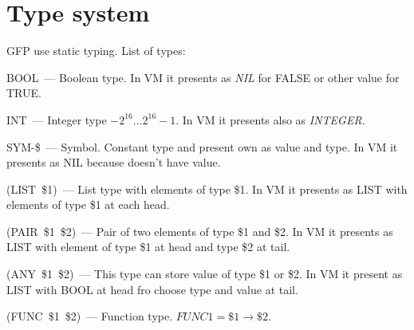 \documentclass[a4paper]{article}
\begin{document}
 {}
 \section{Type system}
  GFP use static typing. List of types:
  \begin{list}{-}{}
   \item BOOL~--- Boolean type. In VM it presents as \textit{NIL} for FALSE or other value for TRUE. 
   \item INT~--- Integer type $-2^{16} \ldots 2^{16}-1$. In VM it presents also as \textit{INTEGER}.
   \item SYM-\$~--- Symbol. Constant type and present own as value and type. In VM it presents as NIL because doesn't have value.
   \item (LIST~\$1)~--- List type with elements of type \$1. In VM it presents as LIST with elements of type \$1 at each head.
   \item (PAIR~\$1~\$2)~--- Pair of two elements of type \$1 and \$2. In VM it presents as LIST with element of type \$1 at head and type \$2 at tail.
   \item (ANY~\$1~\$2)~--- This type can store value of type \$1 or \$2. In VM it present as LIST with BOOL at head fro choose type and value at tail.
   \item (FUNC~\$1~\$2)~--- Function type. $FUNC1 = \$1 \rightarrow \$2$.
  \end{list}
\end{document}
